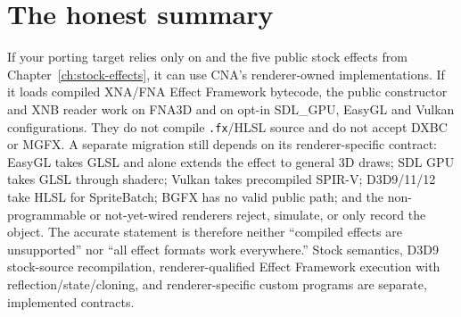 \section{The honest summary}

If your porting target relies only on  and the five public stock effects
from Chapter~\ref{ch:stock-effects}, it can use CNA's renderer-owned implementations. If it loads
compiled XNA/FNA Effect Framework bytecode, the public constructor and XNB reader work on FNA3D
and on opt-in SDL\_GPU, EasyGL and Vulkan configurations. They do not compile \texttt{.fx}/HLSL
source and do not accept DXBC or MGFX. A separate  migration still depends
on its renderer-specific contract: EasyGL
takes GLSL and alone extends the effect to general 3D draws; SDL GPU takes GLSL through shaderc;
Vulkan takes precompiled SPIR-V; D3D9/11/12 take HLSL for SpriteBatch; BGFX has no valid public
path; and the non-programmable or not-yet-wired renderers reject, simulate, or only record the
object. The accurate statement is therefore neither ``compiled effects are unsupported'' nor
``all effect formats work everywhere.'' Stock semantics, D3D9 stock-source recompilation,
renderer-qualified Effect Framework execution with reflection/state/cloning, and
renderer-specific custom programs are separate, implemented contracts.
